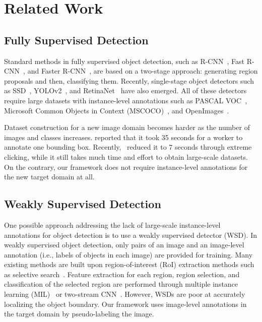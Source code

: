 \documentclass[10pt,twocolumn,letterpaper]{article}
\begin{document}
\section{Related Work}
\subsection{Fully Supervised Detection}
\label{subsec:fully_supervised_detection}
Standard methods in fully supervised object detection, such as R-CNN~\cite{girshick2014rich}, Fast R-CNN~\cite{girshick2015fast}, and Faster R-CNN~\cite{ren2015faster}, are based on a two-stage approach: generating region proposals and then, classifying them.
Recently, single-stage object detectors such as SSD~\cite{liu2016ssd}, YOLOv2~\cite{redmon2016yolo9000}, and RetinaNet~\cite{lin2017focal} have also emerged.
All of these detectors require large datasets with instance-level annotations such as PASCAL VOC~\cite{everingham2010pascal}, Microsoft Common Objects in Context (MSCOCO)~\cite{lin2014microsoft}, and OpenImages~\cite{openimages}.

Dataset construction for a new image domain becomes harder as the number of images and classes increases.
\cite{su2012crowdsourcing} reported that it took 35 seconds for a worker to annotate one bounding box.
Recently,~\cite{papadopoulos2017extreme} reduced it to 7 seconds through extreme clicking, while it still takes much time and effort to obtain large-scale datasets.
On the contrary, our framework does not require instance-level annotations for the new target domain at all.

\subsection{Weakly Supervised Detection}
\label{subsec:weakly_supervised_detection}
One possible approach addressing the lack of large-scale instance-level annotations for object detection is to use a weakly supervised detector (WSD).
In weakly supervised object detection, only pairs of an image and an image-level annotation (i.e., labels of objects in each image) are provided for training.
Many existing methods are built upon region-of-interest (RoI) extraction methods such as selective search~\cite{uijlings2013selective}.
Feature extraction for each region, region selection, and classification of the selected region are performed through multiple instance learning (MIL)~\cite{song2014learning,gokberk2014multi,song2014weakly,bilen2015weakly,li2016weakly} or two-stream CNN~\cite{bilen2016weakly,kantorov2016contextlocnet,tang2017multiple}.
However, WSDs are poor at accurately localizing the object boundary.
Our framework uses image-level annotations in the target domain by pseudo-labeling the image.
\end{document}
